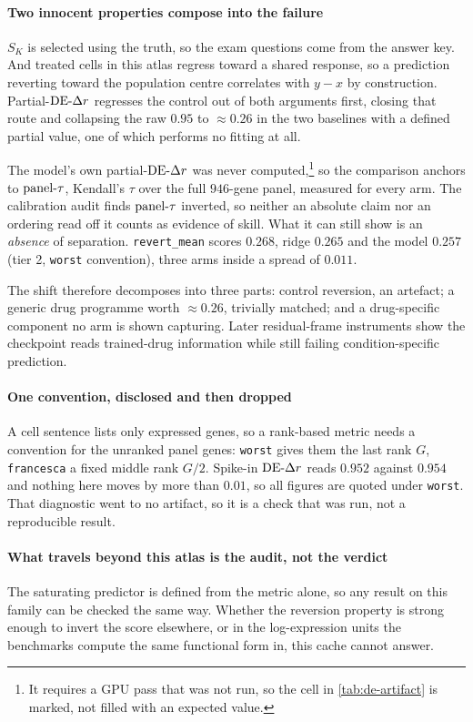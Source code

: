 \paragraph{Two innocent properties compose into the failure} $S_K$ is selected
using the truth, so the exam questions come from the answer key. And treated
cells in this atlas regress toward a shared response, so a prediction reverting
toward the population centre correlates with $y - x$ by construction.
Partial-$\textrm{DE-}\Delta r$ regresses the control out of both arguments first, closing that
route and collapsing the raw $0.95$ to $\approx 0.26$ in the two baselines with
a defined partial value, one of which performs no fitting at all.

The model's own partial-$\textrm{DE-}\Delta r$ was never computed,\footnote{It requires a GPU
pass that was not run, so the cell in \cref{tab:de-artifact} is marked, not
filled with an expected value.} so the comparison anchors to $\textrm{panel-}\tau$,
Kendall's $\tau$ over the full $\num{946}$-gene panel, measured for every arm.
The calibration audit finds $\textrm{panel-}\tau$ inverted, so neither an absolute claim
nor an ordering read off it counts as evidence of skill. What it can still show
is an \emph{absence} of separation. \texttt{revert\_mean} scores $0.268$, ridge
$0.265$ and the model $0.257$ (tier 2, \texttt{worst} convention), three arms
inside a spread of $0.011$.

The shift therefore decomposes into three parts: control reversion, an
artefact; a generic drug programme worth $\approx 0.26$, trivially matched; and
a drug-specific component no arm is shown capturing. Later residual-frame
instruments show the checkpoint reads trained-drug information while still
failing condition-specific prediction.

\paragraph{One convention, disclosed and then dropped} A cell sentence lists
only expressed genes, so a rank-based metric needs a convention for the unranked
panel genes: \texttt{worst} gives them the last rank $G$, \texttt{francesca} a
fixed middle rank $G/2$. Spike-in $\textrm{DE-}\Delta r$ reads $0.952$ against $0.954$ and
nothing here moves by more than $0.01$, so all figures are quoted under
\texttt{worst}. That diagnostic went to no artifact, so it is a check that was
run, not a reproducible result.

\paragraph{What travels beyond this atlas is the audit, not the verdict} The
saturating predictor is defined from the metric alone, so any result on this
family can be checked the same way. Whether the reversion property is strong
enough to invert the score elsewhere, or in the log-expression units the
benchmarks compute the same functional form in, this cache cannot answer.

